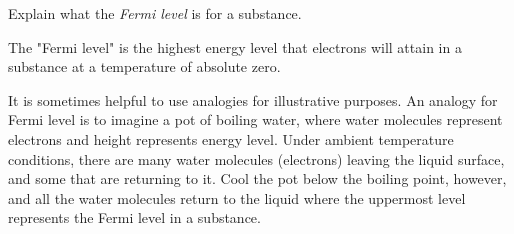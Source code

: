 

Explain what the {\it Fermi level} is for a substance.







The "Fermi level" is the highest energy level that electrons will attain in a substance at a temperature of absolute zero.







It is sometimes helpful to use analogies for illustrative purposes.  An analogy for Fermi level is to imagine a pot of boiling water, where water molecules represent electrons and height represents energy level.  Under ambient temperature conditions, there are many water molecules (electrons) leaving the liquid surface, and some that are returning to it.  Cool the pot below the boiling point, however, and all the water molecules return to the liquid where the uppermost level represents the Fermi level in a substance.




